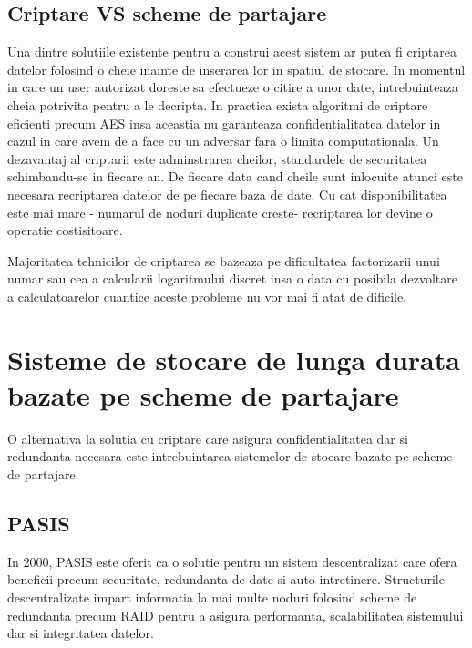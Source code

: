 \documentclass{llncs}
\begin{document}
\subsection{Criptare VS scheme de partajare}


Una dintre solutiile existente pentru a construi acest sistem ar putea fi criptarea datelor folosind o cheie inainte de inserarea lor in spatiul de stocare. In momentul in care un user autorizat doreste sa efectueze o citire a unor date, intrebuinteaza cheia potrivita pentru a le decripta.
In practica exista algoritmi de criptare eficienti precum AES insa aceastia nu garanteaza confidentialitatea datelor in cazul in care avem de a face cu un adversar fara o limita computationala. Un dezavantaj al criptarii este adminstrarea cheilor, standardele de securitatea schimbandu-se in fiecare an.
De fiecare data cand cheile sunt inlocuite atunci este necesara recriptarea datelor de pe fiecare baza de date. Cu cat disponibilitatea este mai mare - numarul de noduri duplicate creste- recriptarea lor devine o operatie costisitoare. 

Majoritatea tehnicilor de criptarea se bazeaza pe dificultatea factorizarii unui numar sau cea a calcularii logaritmului discret insa o data cu posibila dezvoltare a calculatoarelor cuantice aceste probleme nu vor mai fi atat de dificile. \cite{Shor:1994}

\section{Sisteme de stocare de lunga durata bazate pe scheme de partajare}

O alternativa la solutia cu criptare care asigura confidentialitatea dar si redundanta necesara este intrebuintarea sistemelor de stocare bazate pe scheme de partajare. \cite{W:2000,SB:2005,SGMV:2009}


\subsection{PASIS}
In 2000, PASIS este oferit ca o solutie pentru un sistem descentralizat care ofera beneficii precum securitate, redundanta de date si auto-intretinere.
Structurile descentralizate impart informatia la mai multe noduri folosind scheme de redundanta precum RAID pentru a asigura performanta, scalabilitatea sistemului dar si integritatea datelor. \cite{Patterson:1988}
\end{document}
